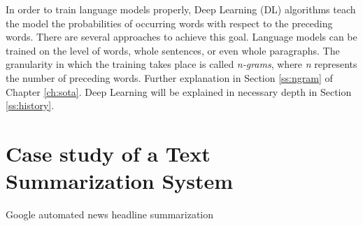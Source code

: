 In order to train language models properly, Deep Learning (DL) algorithms teach the model the probabilities of occurring words with respect to the preceding words. There are several approaches to achieve this goal. Language models can be trained on the level of words, whole sentences, or even whole paragraphs. The granularity in which the training takes place is called \textit{n-grams}, where \textit{n} represents the number of preceding words. Further explanation in Section \ref{ss:ngram} of Chapter \ref{ch:sota}. Deep Learning will be explained in necessary depth in Section \ref{ss:history}.



\section{Case study of a Text Summarization System}

Google automated news headline summarization 





